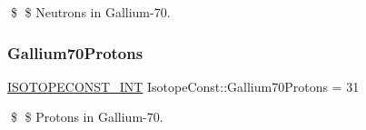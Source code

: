 \$ \$ Neutrons in Gallium-\/70. \mbox{\label{group___isotope_const-_gallium-_ga70_ga661afbad10f2b35be9d3124db7a0e6a0}} 
\subsubsection{\texorpdfstring{Gallium70\+Protons}{Gallium70Protons}}
{\footnotesize\ttfamily \mbox{\hyperlink{group___isotope_const-_macros_ga5f18360b3e99483a35c32d789e62621c}{I\+S\+O\+T\+O\+P\+E\+C\+O\+N\+S\+T\+\_\+\+I\+NT}} Isotope\+Const\+::\+Gallium70\+Protons = 31}

\$ \$ Protons in Gallium-\/70. 